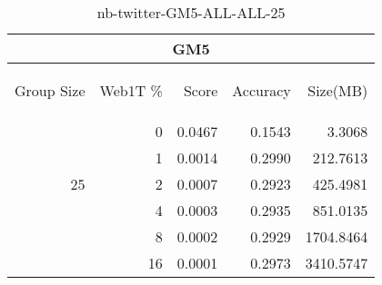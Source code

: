 \begin{center}
\begin{table}[htbp] 
 \begin{center}
\begin{tabular}{ | r | r | r | r | r |}
\hline
\multicolumn{5}{|c|}{GM5}\\
\hline
\begin{sideways}Group Size\end{sideways} & \begin{sideways}Web1T \%\end{sideways} & \begin{sideways}Score\end{sideways} & \begin{sideways}Accuracy\end{sideways} & \begin{sideways}Size(MB)\end{sideways}\\
\hline
\multirow{5}{*}{25}
 & 0 & 0.0467 & 0.1543 & 3.3068\\ \cline{2-5}
 & 1 & 0.0014 & 0.2990 & 212.7613\\ \cline{2-5}
 & 2 & 0.0007 & 0.2923 & 425.4981\\ \cline{2-5}
 & 4 & 0.0003 & 0.2935 & 851.0135\\ \cline{2-5}
 & 8 & 0.0002 & 0.2929 & 1704.8464\\ \cline{2-5}
 & 16 & 0.0001 & 0.2973 & 3410.5747\\ \cline{2-5}
\hline
\end{tabular}
\caption{nb-twitter-GM5-ALL-ALL-25}
\label{table:nb-twitter-GM5-ALL-ALL-25}
\end{center}
 \end{table}
\end{center}

